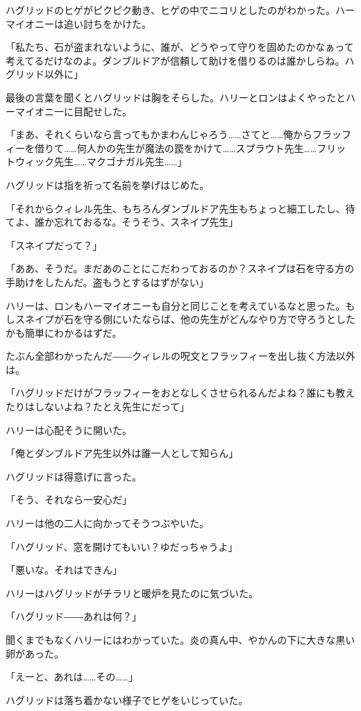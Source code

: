 \documentclass[10pt,a4paper]{article}
\begin{document}
\begin{CJK}{UTF8}{min}
ハグリッドのヒゲがピクピク動き、ヒゲの中でニコリとしたのがわかった。ハーマイオニーは追い討ちをかけた。

「私たち、石が盗まれないように、誰が、どうやって守りを固めたのかなぁって考えてるだけなのよ。ダンブルドアが信頼して助けを借りるのは誰かしらね。ハグリッド以外に」

最後の言葉を聞くとハグリッドは胸をそらした。ハリーとロンはよくやったとハーマイオニ一に目配せした。

「まあ、それくらいなら言ってもかまわんじゃろう……さてと……俺からフラッフィーを借りて……何人かの先生が魔法の罠をかけて……スプラウト先生……フリットウィック先生……マクゴナガル先生……」

ハグリッドは指を祈って名前を挙げはじめた。

「それからクィレル先生、もちろんダンブルドア先生もちょっと細工したし、待てよ、誰か忘れておるな。そうそう、スネイプ先生」

「スネイプだって？」

「ああ、そうだ。まだあのことにこだわっておるのか？スネイプは石を守る方の手助けをしたんだ。盗もうとするはずがない」

ハリーは、ロンもハーマイオニーも自分と同じことを考えているなと思った。もしスネイプが石を守る側にいたならば、他の先生がどんなやり方で守ろうとしたかも簡単にわかるはずだ。

たぶん全部わかったんだ――クィレルの呪文とフラッフィーを出し抜く方法以外は。

「ハグリッドだけがフラッフィーをおとなしくさせられるんだよね？誰にも教えたりはしないよね？たとえ先生にだって」

ハリーは心配そうに開いた。

「俺とダンブルドア先生以外は誰一人として知らん」

ハグリッドは得意げに言った。

「そう、それなら一安心だ」

ハリーは他の二人に向かってそうつぶやいた。

「ハグリッド、窓を開けてもいい？ゆだっちゃうよ」

「悪いな。それはできん」

ハリーはハグリッドがチラリと暖炉を見たのに気づいた。

「ハグリッド――あれは何？」

聞くまでもなくハリーにはわかっていた。炎の真ん中、やかんの下に大きな黒い卵があった。

「えーと、あれは……その……」

ハグリッドは落ち着かない様子でヒゲをいじっていた。


\end{CJK}
\end{document}

